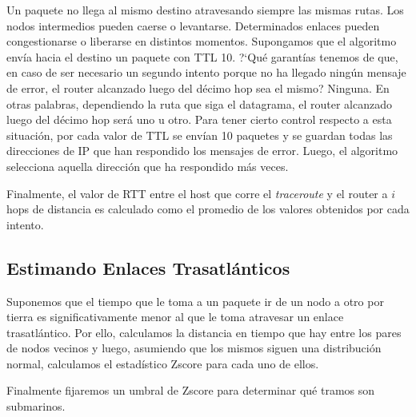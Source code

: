 Un paquete no llega al mismo destino atravesando siempre las mismas rutas. Los nodos intermedios pueden
caerse o levantarse. Determinados enlaces pueden congestionarse o liberarse en distintos momentos.
Supongamos que el algoritmo env\'ia hacia el destino un paquete con TTL 10. ?`Qu\'e garant\'ias tenemos de que,
en caso de ser necesario un segundo intento porque no ha llegado ning\'un mensaje de error, el router
alcanzado luego del d\'ecimo hop sea el mismo? Ninguna. En otras palabras, dependiendo la ruta que siga
el datagrama, el router alcanzado luego del d\'ecimo hop ser\'a uno u otro.
Para tener cierto control respecto a esta situaci\'on, por cada valor de TTL se env\'ian 10 paquetes y
se guardan todas las direcciones de IP que han respondido los mensajes de error.
Luego, el algoritmo selecciona aquella direcci\'on que ha respondido m\'as veces.

Finalmente, el valor de RTT entre el host que corre el \emph{traceroute} y el router a $i$ hops de
distancia es calculado como el promedio de los valores obtenidos por cada intento.


\subsection{Estimando Enlaces Trasatl\'anticos}
Suponemos que el tiempo que le toma a un paquete ir de un nodo a otro 
por tierra es significativamente menor al que le toma atravesar un 
enlace trasatl\'antico. Por ello, calculamos la distancia en tiempo
que hay entre los pares de nodos vecinos y luego, asumiendo que los
mismos siguen una distribuci\'on normal, calculamos el estad\'istico
Zscore para cada uno de ellos. 

Finalmente fijaremos un umbral de Zscore para determinar qu\'e tramos
son submarinos. 
